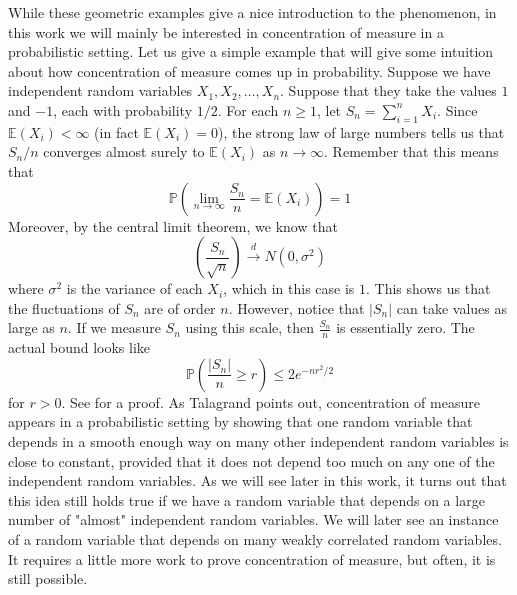\documentclass[12pt]{report}
\theoremstyle{definition}
\begin{document}
While these geometric examples give a nice introduction to the phenomenon, in this work we will mainly be interested in concentration of measure in a probabilistic setting. Let us give a simple example that will give some intuition about how concentration of measure comes up in probability.  Suppose we have independent random variables $X_1,X_2,\dots, X_n$.  Suppose that they take the values $1$ and $-1$, each with probability $1/2$.  For each $n\geq 1$, let $S_n=\sum_{i=1}^n X_i$.  Since $\mathbb{E}(X_i)<\infty$ (in fact $\mathbb{E}(X_i)=0$), the strong law of large numbers tells us that $S_n/n$ converges almost surely to $\mathbb{E}(X_i)$ as $n\rightarrow\infty$.  Remember that this means that 
$$
\mathbb{P}\left(\lim_{n\rightarrow\infty} \frac{S_n}{n}=\mathbb{E}(X_i)\right)=1
$$ 
Moreover, by the central limit theorem, we know that 
$$
\left(\frac{S_n}{\sqrt{n}}\right)\xrightarrow{d} N(0,\sigma^2)
$$
where $\sigma^2$ is the variance of each $X_i$, which in this case is $1$.  This shows us that the fluctuations of $S_n$ are of order $n$.  However, notice that $|S_n|$ can take values as large as $n$.  If we measure $S_n$ using this scale, then $\frac{S_n}{n}$ is essentially zero.  The actual bound looks like 
$$
\mathbb{P}\left(\frac{|S_n|}{n}\geq r\right)\leq 2e^{-nr^2/2}
$$
for $r>0$.  See \cite{TalagrandInd} for a proof.  As Talagrand points out, concentration of measure appears in a probabilistic setting by showing that one random variable that depends in a smooth enough way on many other independent random variables is close to constant, provided that it does not depend too much on any one of the independent random variables.  As we will see later in this work, it turns out that this idea still holds true if we have a random variable that depends on a large number of "almost" independent random variables.  We will later see an instance of a random variable that depends on many weakly correlated random variables.  It requires a little more work to prove concentration of measure, but often, it is still possible. 
\end{document}
